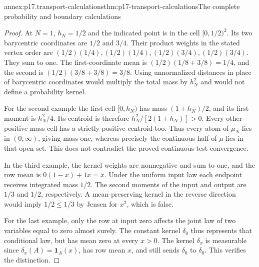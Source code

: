 \begin{annexitem}{annex:p17.transport-calculations}{thm:p17-transport-calculations}{The complete probability and boundary calculations}
\begin{proof}
At \(N=1\), \(h_N=1/2\) and the indicated point is in the cell
\([0,1/2)^2\). Its two barycentric coordinates are \(1/2\) and \(3/4\).
Their product weights in the stated vertex order are
\((1/2)(1/4),(1/2)(1/4),(1/2)(3/4),(1/2)(3/4)\).
They sum to one. The first-coordinate mean is
\((1/2)(1/8+3/8)=1/4\), and the second is
\((1/2)(3/8+3/8)=3/8\).
Using unnormalized distances in place of barycentric coordinates
would multiply the total mass by \(h_N^2\) and would not define
a probability kernel.

For the second example the first cell \([0,h_N)\) has mass
\((1+h_N)/2\), and its first moment is \(h_N^2/4\).
Its centroid is therefore \(h_N^2/[2(1+h_N)]>0\).
Every other positive-mass cell has a strictly positive centroid too.
Thus every atom of \(\mu_N\) lies in \((0,\infty)\), giving mass one,
whereas precisely the continuous half of \(\mu\) lies in that open set.
This does not contradict the proved continuous-test convergence.

In the third example, the kernel weights are nonnegative and sum to one,
and the row mean is \(0(1-x)+1x=x\).
Under the uniform input law each endpoint receives integrated mass
\(1/2\). The second moments of the input and output are \(1/3\)
and \(1/2\), respectively. A mean-preserving kernel in the reverse
direction would imply \(1/2\leq1/3\) by Jensen for \(x^2\),
which is false.

For the last example, only the row at input zero affects the joint
law of two variables equal to zero almost surely. The constant
kernel \(\delta_0\) thus represents that conditional law, but has
mean zero at every \(x>0\). The kernel \(\delta_x\) is measurable
since \(\delta_x(A)=\mathbf1_A(x)\), has row mean \(x\), and
still sends \(\delta_0\) to \(\delta_0\). This verifies the distinction.
\end{proof}
\end{annexitem}

